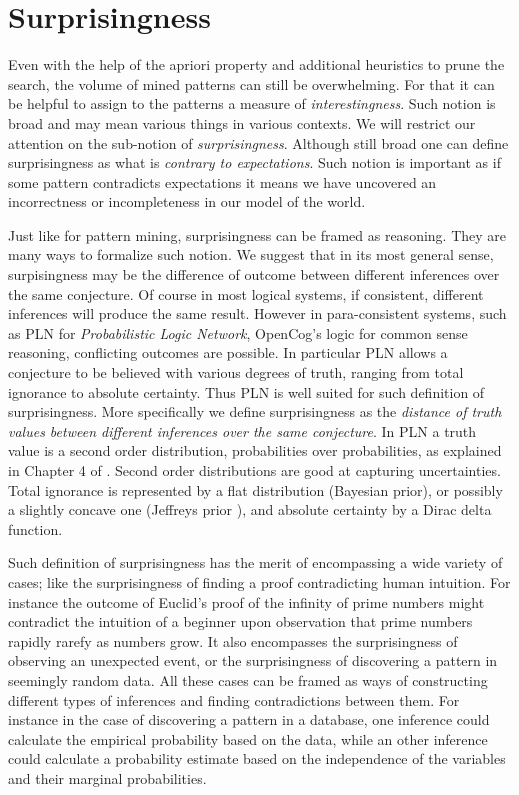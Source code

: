 \documentclass[runningheads]{llncs}
\begin{document}
\section{Surprisingness}
\label{SUR}

Even with the help of the apriori property and additional heuristics
to prune the search, the volume of mined patterns can still be
overwhelming. For that it can be helpful to assign to the patterns a
measure of \emph{interestingness}. Such notion is broad and may mean
various things in various contexts. We will restrict our attention on
the sub-notion of \emph{surprisingness}. Although still broad one can
define surprisingness as what is \emph{contrary to expectations}. Such
notion is important as if some pattern contradicts expectations it
means we have uncovered an incorrectness or incompleteness in our
model of the world.

Just like for pattern mining, surprisingness can be framed as
reasoning. They are many ways to formalize such notion. We suggest
that in its most general sense, surpisingness may be the difference of
outcome between different inferences over the same conjecture. Of
course in most logical systems, if consistent, different inferences
will produce the same result. However in para-consistent systems, such
as PLN \cite{Goertzel2009PLN} for \emph{Probabilistic Logic Network},
OpenCog's logic for common sense reasoning, conflicting outcomes are
possible. In particular PLN allows a conjecture to be believed with
various degrees of truth, ranging from total ignorance to absolute
certainty. Thus PLN is well suited for such definition of
surprisingness. More specifically we define surprisingness as the
\emph{distance of truth values between different inferences over the
  same conjecture}. In PLN a truth value is a second order
distribution, probabilities over probabilities, as explained in
Chapter 4 of \cite{Goertzel2009PLN}. Second order distributions are
good at capturing uncertainties. Total ignorance is represented by a
flat distribution (Bayesian prior), or possibly a slightly concave one
(Jeffreys prior \cite{Jeffreys46Invariant}), and absolute certainty by
a Dirac delta function.

Such definition of surprisingness has the merit of encompassing a wide
variety of cases; like the surprisingness of finding a proof
contradicting human intuition. For instance the outcome of Euclid's
proof of the infinity of prime numbers might contradict the intuition
of a beginner upon observation that prime numbers rapidly rarefy as
numbers grow. It also encompasses the surprisingness of observing an
unexpected event, or the surprisingness of discovering a pattern in
seemingly random data. All these cases can be framed as ways of
constructing different types of inferences and finding contradictions
between them. For instance in the case of discovering a pattern in a
database, one inference could calculate the empirical probability
based on the data, while an other inference could calculate a
probability estimate based on the independence of the variables and
their marginal probabilities.
\end{document}
